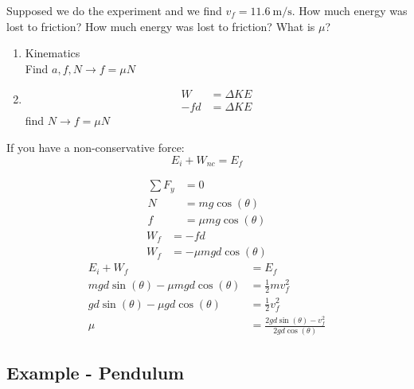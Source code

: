 \documentclass{article}
\begin{document}
Supposed we do the experiment and we find $ v_f = \SI{11.6}{\meter \per \second} $. How much energy was lost to friction? How much energy was lost to friction? What is $ \mu $?
\begin{enumerate}[label=\textbf{\arabic*)}]
	\item
		Kinematics \\
		Find $ a, f, N \rightarrow f = \mu N $
	\item
		\begin{align*}
			W & = \Delta KE \\
			-fd & = \Delta KE
		\end{align*}
		find $ N \rightarrow f = \mu N $
\end{enumerate}
If you have a non-conservative force:
\begin{equation}
	E_i + W_{nc} = E_f
\end{equation}
\begin{align*}
	\sum F_y & = 0 \\
	N & = mg\cos(\theta) \\
	f & = \mu mg\cos(\theta)
\end{align*}
\begin{align*}
	W_f & = -fd \\
	W_f & = -\mu mgd\cos(\theta)
\end{align*}
\begin{align*}
	E_i + W_f & = E_f \\
	mgd\sin(\theta) - \mu mgd\cos(\theta) & = \frac{1}{2}mv_f^2 \\
	gd\sin(\theta) - \mu gd\cos(\theta) & = \frac{1}{2}v_f^2 \\
	\mu & = \frac{2gd\sin(\theta) - v_f^2}{2gd\cos(\theta)}
\end{align*}

\subsection{Example - Pendulum}
\end{document}
